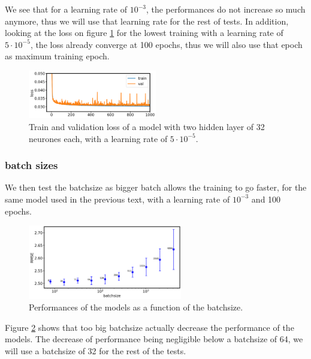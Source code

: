 \documentclass[a4paper, 11pt]{article}
\begin{document}
    We see that for a learning rate of $10^{-3}$, the performances do not increase so much anymore, thus we will use that learning rate for the rest of tests. In addition, looking at the loss on figure  \ref{fig:lr_test_loss} for the lowest training with a learning rate of $5\cdot10^{-5}$, the loss already converge at 100 epochs, thus we will also use that epoch as maximum training epoch.
        \begin{figure}[H]                                           
    	\centering \includegraphics[width=0.5\textwidth]{images/final_lr_test_loss.png}
    	\caption{Train and validation loss of a model with two hidden layer of 32 neurones each, with a learning rate of $5\cdot10^{-5}$.}
    	\label{fig:lr_test_loss}
    \end{figure}
    
    
    
    
    \subsubsection{batch sizes}
    We then test the batchsize as bigger batch allows the training to go faster, for the same model used in the previous text, with a learning rate of  $10^{-3}$ and 100 epochs.
     \begin{figure}[H]                                           
    	\centering \includegraphics[width=0.6\textwidth]{images/batch_size_test.png}
    	\caption{Performances of the models as a function of the batchsize.}
    	\label{fig:batchsize_test}
    \end{figure}
    Figure \ref{fig:batchsize_test} shows that too big batchsize actually decrease the performance of the models. The decrease of performance being negligible below a batchsize of 64, we will use a batchsize of 32 for the rest of the tests.
    
\end{document}

